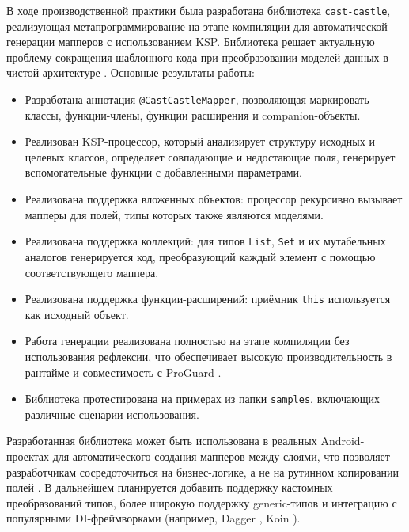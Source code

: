 
В ходе производственной практики была разработана библиотека \texttt{cast-castle}, реализующая метапрограммирование на этапе компиляции для автоматической генерации мапперов с использованием KSP. Библиотека решает актуальную проблему сокращения шаблонного кода при преобразовании моделей данных в чистой архитектуре \cite{refd}. Основные результаты работы:

\begin{itemize}
    \item Разработана аннотация \texttt{@CastCastleMapper}, позволяющая маркировать классы, функции-члены, функции расширения и companion-объекты.
    \item Реализован KSP-процессор, который анализирует структуру исходных и целевых классов, определяет совпадающие и недостающие поля, генерирует вспомогательные функции с добавленными параметрами.
    \item Реализована поддержка вложенных объектов: процессор рекурсивно вызывает мапперы для полей, типы которых также являются моделями.
    \item Реализована поддержка коллекций: для типов \texttt{List}, \texttt{Set} и их мутабельных аналогов генерируется код, преобразующий каждый элемент с помощью соответствующего маппера.
    \item Реализована поддержка функции-расширений: приёмник \texttt{this} используется как исходный объект.
    \item Работа генерации реализована полностью на этапе компиляции без использования рефлексии, что обеспечивает высокую производительность в рантайме и совместимость с ProGuard \cite{refc}.
    \item Библиотека протестирована на примерах из папки \texttt{samples}, включающих различные сценарии использования.
\end{itemize}

Разработанная библиотека может быть использована в реальных Android-проектах для автоматического создания мапперов между слоями, что позволяет разработчикам сосредоточиться на бизнес-логике, а не на рутинном копировании полей \cite{refh}. В дальнейшем планируется добавить поддержку кастомных преобразований типов, более широкую поддержку generic-типов и интеграцию с популярными DI-фреймворками (например, Dagger \cite{refc}, Koin \cite{refg}).
